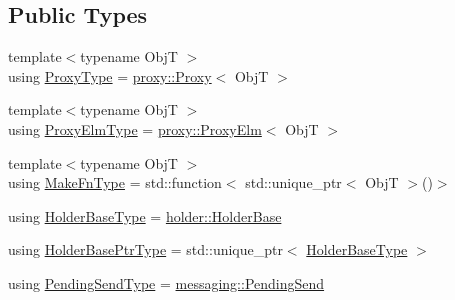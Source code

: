\subsection*{Public Types}
\begin{DoxyCompactItemize}
\item 
{\footnotesize template$<$typename ObjT $>$ }\\using \hyperlink{structvt_1_1objgroup_1_1_obj_group_manager_aea65eef52f240a52210132eef5ce591f}{Proxy\+Type} = \hyperlink{structvt_1_1objgroup_1_1proxy_1_1_proxy}{proxy\+::\+Proxy}$<$ ObjT $>$
\item 
{\footnotesize template$<$typename ObjT $>$ }\\using \hyperlink{structvt_1_1objgroup_1_1_obj_group_manager_adba6c8ecb0f4c30e719f1abb995cfc9b}{Proxy\+Elm\+Type} = \hyperlink{structvt_1_1objgroup_1_1proxy_1_1_proxy_elm}{proxy\+::\+Proxy\+Elm}$<$ ObjT $>$
\item 
{\footnotesize template$<$typename ObjT $>$ }\\using \hyperlink{structvt_1_1objgroup_1_1_obj_group_manager_a397d787b3876752a6d70511b2769b872}{Make\+Fn\+Type} = std\+::function$<$ std\+::unique\+\_\+ptr$<$ ObjT $>$()$>$
\item 
using \hyperlink{structvt_1_1objgroup_1_1_obj_group_manager_a4898fc9cabf44890e5593f8c4ab86230}{Holder\+Base\+Type} = \hyperlink{structvt_1_1objgroup_1_1holder_1_1_holder_base}{holder\+::\+Holder\+Base}
\item 
using \hyperlink{structvt_1_1objgroup_1_1_obj_group_manager_ac1e9bb19d4a5923dd6d595bad28f04c9}{Holder\+Base\+Ptr\+Type} = std\+::unique\+\_\+ptr$<$ \hyperlink{structvt_1_1objgroup_1_1_obj_group_manager_a4898fc9cabf44890e5593f8c4ab86230}{Holder\+Base\+Type} $>$
\item 
using \hyperlink{structvt_1_1objgroup_1_1_obj_group_manager_a4f82f640edf670ba5a282074e5710921}{Pending\+Send\+Type} = \hyperlink{structvt_1_1messaging_1_1_pending_send}{messaging\+::\+Pending\+Send}
\end{DoxyCompactItemize}
